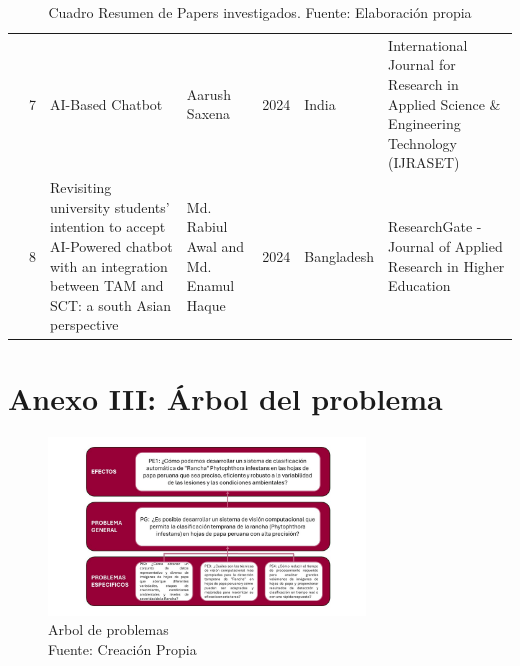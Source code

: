 \begin{table}[h]
\begin{tabular}{|m{0.5cm}|m{0.3cm}|m{4cm}|m{2cm}|m{0.6cm}|m{1.7cm}|m{3cm}|}
		& 7        
		& AI-Based Chatbot
		& Aarush Saxena
		& 2024
		& India
		& International Journal for Research in Applied Science \& Engineering Technology (IJRASET) \\ 

		\cline{2-7}

		& 8        
		& Revisiting university students’ intention to accept AI-Powered chatbot with an integration between TAM and SCT: a south Asian perspective
		& Md. Rabiul Awal and Md. Enamul Haque
		& 2024
		& Bangladesh
		& ResearchGate - Journal of Applied Research in
		Higher Education \\ 
		\hline
	\end{tabular}
	\caption{Cuadro Resumen de Papers investigados. Fuente: Elaboración propia}
\label{A:table}
\end{table}


\chapter{Anexo III: Árbol del problema}

\begin{figure}[h]
	\begin{center}
		\includegraphics[width=0.75\textwidth]{anexos/arbol_problema.jpg}
		\caption{Arbol de problemas 
		\\Fuente: Creación Propia}
		\label{anexos:arbol_problema}
	\end{center}
\end{figure}

